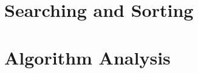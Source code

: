 % 


% 

% 

% 

\chapter{Searching and Sorting}
\thispagestyle{chapterstart}
\pagestyle{otherpages}
\label{chapter-searching-sorting}
\setcounter{excounter}{1}


\chapter{Algorithm Analysis}
\thispagestyle{chapterstart}
\pagestyle{otherpages}
\label{chapter-algorithms}
\setcounter{excounter}{1}


